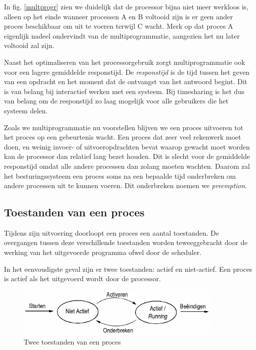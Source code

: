 In fig. \ref{multprogr} zien we duidelijk dat de processor bijna niet
meer werkloos is, alleen op het einde wanneer processen A en B
voltooid zijn is er geen ander proces beschikbaar om uit te voeren
terwijl C wacht. Merk op dat proces A eigenlijk nadeel ondervindt van
de multiprogrammatie, aangezien het nu later voltooid zal zijn.

Naast het optimaliseren van het processorgebruik zorgt
multiprogrammatie ook voor een lagere gemiddelde responstijd. De
\emph{responstijd} is de tijd tussen het geven van een
opdracht en het moment dat de ontvangst van het antwoord begint. Dit
is van belang bij interactief werken met een systeem. Bij timesharing
is het dus van belang om de responstijd zo laag mogelijk voor alle
gebruikers die het systeem delen.

Zoals we multiprogrammatie nu voorstellen blijven we een proces
uitvoeren tot het proces op een gebeurtenis wacht. Een proces dat zeer
veel rekenwerk moet doen, en weinig invoer- of uitvoeropdrachten bevat
waarop gewacht moet worden kan de processor dan relatief lang bezet
houden. Dit is slecht voor de gemiddelde responstijd omdat alle andere
processen dan zolang moeten wachten. Daarom zal het besturingssysteem
een proces soms na een bepaalde tijd onderbreken om andere processen
uit te kunnen voeren. Dit onderbreken noemen we
\emph{preemption}.

\subsection{Toestanden van een proces}

Tijdens zijn uitvoering doorloopt een proces een aantal
toestanden. De overgangen tussen deze verschillende toestanden worden
teweeggebracht door de werking van het uitgevoerde programma ofwel
door de scheduler.

In het eenvoudigste geval zijn er twee toestanden: actief en
niet-actief. Een proces is actief als het uitgevoerd wordt door de
processor.

\begin{figure}
\begin{center}
\includegraphics[width=100mm]{images/fig0502.png}
\caption{Twee toestanden van een proces}
\label{toestproc1}
\end{center}
\end{figure}

